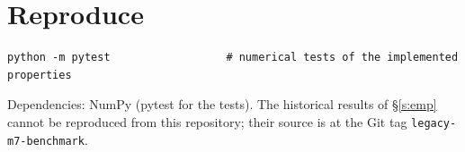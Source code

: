 \documentclass[11pt,a4paper]{article}
\theoremstyle{remark}\newtheorem*{rem}{Remark}
\begin{document}
\section{Reproduce}
\begin{verbatim}
python -m pytest                  # numerical tests of the implemented properties
\end{verbatim}
Dependencies: NumPy (pytest for the tests). The historical results of \S\ref{s:emp} cannot be reproduced
from this repository; their source is at the Git tag \texttt{legacy-m7-benchmark}.
\end{document}
